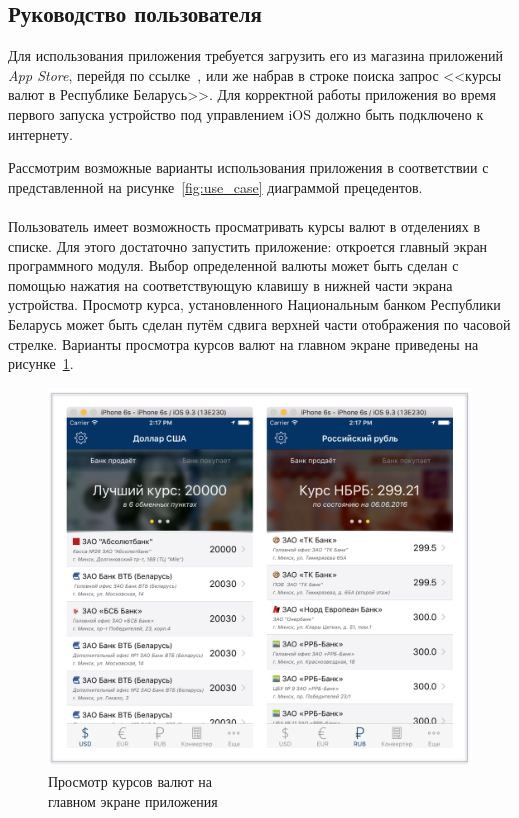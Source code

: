 
\subsection{Руководство пользователя}

Для использования приложения требуется загрузить его из магазина
приложений \textit{App Store}, перейдя по ссылке~\cite{itunes_app_link},
или же набрав в строке поиска запрос <<курсы валют в Республике Беларусь>>.
Для корректной работы приложения во время первого запуска устройство
под управлением iOS должно быть подключено к интернету.

Рассмотрим возможные варианты использования приложения в соответствии с
представленной на рисунке~\ref{fig:use_case} диаграммой прецедентов.



\paragraph{}
Пользователь имеет возможность просматривать курсы валют в отделениях в списке.
Для этого достаточно запустить приложение: откроется главный экран программного модуля.
Выбор определенной валюты может быть сделан с помощью нажатия на соответствующую
клавишу в нижней части экрана устройства. Просмотр курса, установленного
Национальным банком Республики Беларусь может быть сделан путём сдвига
верхней части отображения по часовой стрелке.
Варианты просмотра курсов валют на главном экране приведены на
рисунке~\ref{fig:main_screen_manual}.
\begin{figure}[h!]
  \centering
  \includegraphics[width=120mm]{fig/main_screen_manual}
  \caption{Просмотр курсов валют на \\ главном экране приложения}
  \label{fig:main_screen_manual}
\end{figure}


